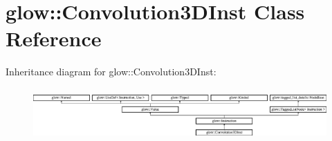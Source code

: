 \hypertarget{classglow_1_1_convolution3_d_inst}{}\section{glow\+:\+:Convolution3\+D\+Inst Class Reference}
\label{classglow_1_1_convolution3_d_inst}
Inheritance diagram for glow\+:\+:Convolution3\+D\+Inst\+:\begin{figure}[H]
\begin{center}
\leavevmode
\includegraphics[height=1.991111cm]{classglow_1_1_convolution3_d_inst}
\end{center}
\end{figure}
